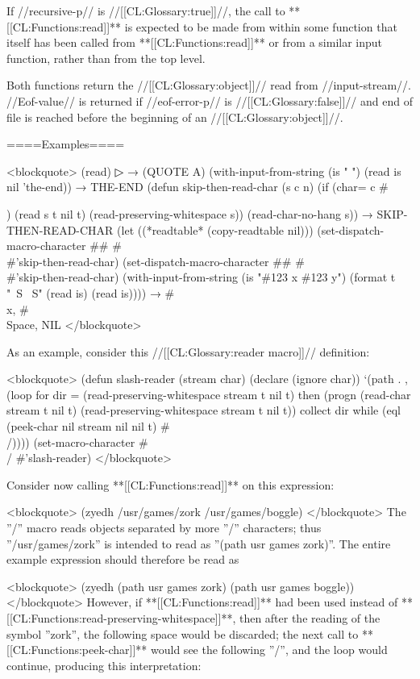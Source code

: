 If //recursive-p// is //[[CL:Glossary:true]]//, the call to **[[CL:Functions:read]]** is expected to be made from within some function that itself has been called from **[[CL:Functions:read]]** or from a similar input function, rather than from the top level.



Both functions return the //[[CL:Glossary:object]]// read from //input-stream//. //Eof-value// is returned if //eof-error-p// is //[[CL:Glossary:false]]// and end of file is reached before the beginning of an //[[CL:Glossary:object]]//.

====Examples====

<blockquote> (read)
▷  → (QUOTE A) (with-input-from-string (is " ") (read is nil 'the-end)) → THE-END (defun skip-then-read-char (s c n) (if (char= c #\\{) (read s t nil t) (read-preserving-whitespace s)) (read-char-no-hang s)) → SKIP-THEN-READ-CHAR (let ((*readtable* (copy-readtable nil))) (set-dispatch-macro-character #\# #\\{ #'skip-then-read-char) (set-dispatch-macro-character #\# #\\} #'skip-then-read-char) (with-input-from-string (is "#{123 x #}123 y") (format t "~S ~S" (read is) (read is)))) → #\\x, #\\Space, NIL </blockquote>

As an example, consider this //[[CL:Glossary:reader macro]]// definition:

<blockquote> (defun slash-reader (stream char) (declare (ignore char)) `(path . ,(loop for dir = (read-preserving-whitespace stream t nil t) then (progn (read-char stream t nil t) (read-preserving-whitespace stream t nil t)) collect dir while (eql (peek-char nil stream nil nil t) #\\/)))) (set-macro-character #\\/ #'slash-reader) </blockquote>

Consider now calling **[[CL:Functions:read]]** on this expression:

<blockquote> (zyedh /usr/games/zork /usr/games/boggle) </blockquote> The ''/'' macro reads objects separated by more ''/'' characters; thus ''/usr/games/zork'' is intended to read as ''(path usr games zork)''. The entire example expression should therefore be read as

<blockquote> (zyedh (path usr games zork) (path usr games boggle)) </blockquote> However, if **[[CL:Functions:read]]** had been used instead of **[[CL:Functions:read-preserving-whitespace]]**, then after the reading of the symbol ''zork'', the following space would be discarded; the next call to **[[CL:Functions:peek-char]]** would see the following ''/'', and the loop would continue, producing this interpretation:

}
